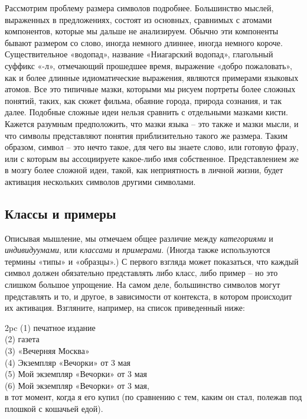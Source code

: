 \documentclass[../main.tex]{subfiles}
\begin{document}
Рассмотрим проблему размера символов подробнее. Большинство мыслей, выраженных в предложениях, состоят из основных, сравнимых с атомами компонентов, которые мы дальше не анализируем. Обычно эти компоненты бывают размером со слово, иногда немного длиннее, иногда немного короче. Существительное «водопад», название «Ниагарский водопад», глагольный суффикс «-л», отмечающий прошедшее время, выражение «добро пожаловать», как и более длинные идиоматические выражения, являются примерами языковых атомов. Все это типичные мазки, которыми мы рисуем портреты более сложных понятий, таких, как сюжет фильма, обаяние города, природа сознания, и так далее. Подобные сложные идеи нельзя сравнить с отдельными мазками кисти. Кажется разумным предположить, что мазки языка \--- это также и мазки мысли, и что символы представляют понятия приблизительно такого же размера. Таким образом, символ \--- это нечто такое, для чего вы знаете слово, или готовую фразу, или с которым вы ассоциируете какое-либо имя собственное. Представлением же в мозгу более сложной идеи, такой, как неприятность в личной жизни, будет активация нескольких символов другими символами.


\subsection{Классы и примеры}

Описывая мышление, мы отмечаем общее различие между \emph{категориями} и \emph{индивидуумами}, или \emph{классами} и \emph{примерами}. (Иногда также используются термины «типы» и «образцы».) С первого взгляда может показаться, что каждый символ должен обязательно представлять либо класс, либо пример \--- но это слишком большое упрощение. На самом деле, большинство символов могут представлять и то, и другое, в зависимости от контекста, в котором происходит их активация. Взгляните, например, на список приведенный ниже:

\smallskip
\noindent{}
    2pc \dimexpr\linewidth-2pc\relax
    3pc \dimexpr\linewidth-3pc\relax
    4pc \dimexpr\linewidth-4pc\relax
    5pc \dimexpr\linewidth-5pc\relax
    6pc \dimexpr\linewidth-6pc\relax
    7pc \dimexpr\linewidth-7pc\relax
    8pc \dimexpr\linewidth-8pc\relax
    9pc \dimexpr\linewidth-9pc\relax
    10pc\dimexpr\linewidth-10pc\relax
(1) печатное издание \\
(2) газета \\
(3) «Вечерняя Москва» \\
(4) Экземпляр «Вечорки» от 3 мая \\
(5) Мой экземпляр «Вечорки» от 3 мая \\
(6) Мой экземпляр «Вечорки» от 3 мая, \\
    в тот момент, когда я его купил (по сравнению с тем, каким он стал, полежав под плошкой с кошачьей едой).
\smallskip
\end{document}

